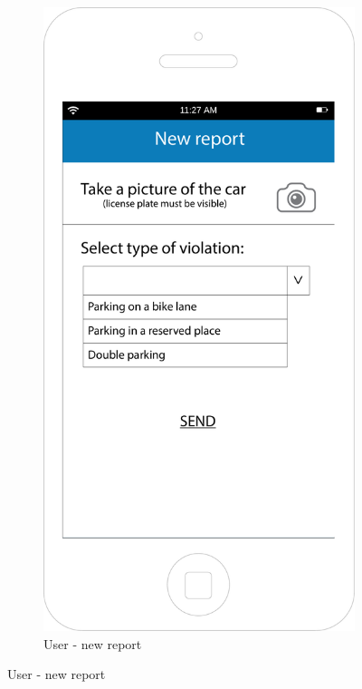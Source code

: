 \documentclass[12pt,a4paper]{report}
\begin{document}
\begin{figure}[H]
\begin{subfigure}{0.5\textwidth}
			\label{List of sent reports}
		\end{subfigure}
		\begin{subfigure}{0.5\textwidth}
			\includegraphics[scale=0.25, center]{Newreport}
			\caption{User -  new report}
			\label{fig:subim2}
		\end{subfigure}
		\end{figure}
\end{document}
